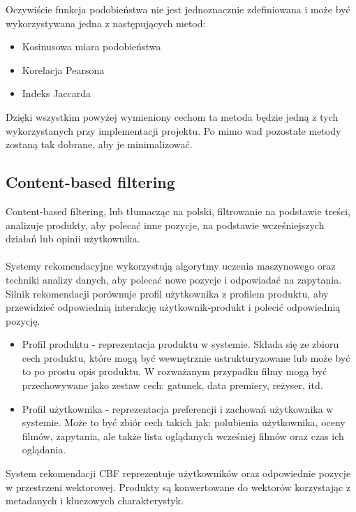 \documentclass{article}
\begin{document}
Oczywiście funkcja podobieństwa nie jest jednoznacznie zdefiniowana i może być wykorzystywana jedna z następujących metod:
\begin{itemize}
    \item Kosinusowa miara podobieństwa
    \item Korelacja Pearsona
    \item Indeks Jaccarda
\end{itemize}
Dzięki wszystkim powyżej wymieniony cechom ta metoda będzie jedną z tych wykorzystanych przy implementacji projektu. Po mimo wad pozostałe metody zostaną tak dobrane, aby je minimalizować.
\subsection{Content-based filtering}
\label{sec:content-based filtering}
Content-based filtering, lub tłumacząc na polski, filtrowanie na podstawie treści, analizuje produkty, aby polecać inne pozycje, na podstawie wcześniejszych działań lub opinii użytkownika. \\ \\
Systemy rekomendacyjne wykorzystują algorytmy uczenia maszynowego oraz techniki analizy danych, aby polecać nowe pozycje i odpowiadać na zapytania. Silnik rekomendacji porównuje profil użytkownika z profilem produktu, aby przewidzieć odpowiednią interakcję użytkownik-produkt i polecić odpowiednią pozycję.
\begin{itemize}
    \item Profil produktu - reprezentacja produktu w systemie. Składa się ze zbioru cech produktu, które mogą być wewnętrznie ustrukturyzowane lub może być to po prostu opis produktu. W rozważanym przypadku filmy mogą być przechowywane jako zestaw cech: gatunek, data premiery, reżyser, itd.
    \item Profil użytkownika - reprezentacja preferencji i zachowań użytkownika w systemie. Może to być zbiór cech takich jak: polubienia użytkownika, oceny filmów, zapytania, ale także lista oglądanych wcześniej filmów oraz czas ich oglądania.
\end{itemize}
System rekomendacji CBF reprezentuje użytkowników oraz odpowiednie pozycje w przestrzeni wektorowej. Produkty są konwertowane do wektorów korzystając z metadanych i kluczowych charakterystyk. 
\end{document}
